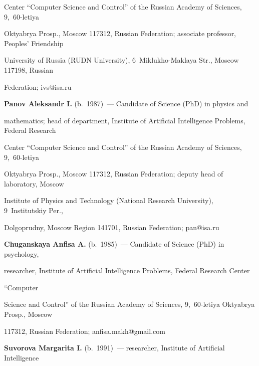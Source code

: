 Center ``Computer Science and Control'' of the Russian Academy of Sciences, 9,~60-letiya 

Oktyabrya Prosp., Moscow 117312, Russian Federation; associate professor, Peoples' Friendship 

University of Russia (RUDN University), 6~Miklukho-Maklaya Str., Moscow 117198, Russian 

Federation; \mbox{ivs@isa.ru}

  

  \vspace*{3pt}

  

  \noindent

  \textbf{Panov Aleksandr I.} (b.\ 1987)~--- Candidate of Science (PhD) in physics and 

mathematics; head of department, Institute of Artificial Intelligence Problems, Federal Research 

Center ``Computer Science and Control'' of the Russian Academy of Sciences, 9,~60-letiya 

Oktyabrya Prosp., Moscow 117312, Russian Federation; deputy head of laboratory, Moscow 

Institute of Physics and Technology (National Research University), 9~Institutskiy Per., 

Dolgoprudny, Moscow Region 141701, Russian Federation; \mbox{pan@isa.ru}

  

  \vspace*{3pt}

  

  

  \noindent

  \textbf{Chuganskaya Anfisa A.} (b.\ 1985)~--- Candidate of Science (PhD) in psychology, 

researcher, Institute of Artificial Intelligence Problems, Federal Research Center 

``Computer 

Science and Control'' of the Russian Academy of Sciences, 9,~60-letiya Oktyabrya Prosp., Moscow 

117312, Russian Federation; \mbox{anfisa.makh@gmail.com}

  

  \vspace*{3pt}

  

  

  \noindent

  \textbf{Suvorova Margarita I.} (b.\ 1991)~--- researcher, Institute of Artificial Intelligence 

